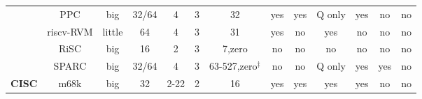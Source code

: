 \begin{sidewaystable}[tbp]
\begin{sf}
\begin{footnotesize}
\begin{center}
\begin{tabular}{|c|c||c|c|c|c|c|c|c|c|c|c|c|}
                 & %
PPC              & %
big              & %
32/64            & %
4                & %
3                & %
32               & %
yes              & %
yes              & %
Q only           & %
yes              & %
no               & %
no                 %
\\
\cline{2-13}

		 & %
riscv-RVM        & %
little           & %
64               & %
4                & %
3                & %
31               & %
yes              & %
no               & %
yes              & %
no               & %
no               & %
no                 %
\\
\cline{2-13}

                 & %
RiSC             & %
big              & %
16               & %
2                & %
3                & %
7,zero           & %
no               & %
no               & %
no               & %
no               & %
no               & %
no                 %
\\
\cline{2-13}

                 & %
SPARC            & %
big              & %
32/64            & %
4                & %
3                & %
63-527,zero$^{\ddagger}$ & %
no               & %
no               & %
Q only           & %
yes              & %
yes              & %
no                 %
\\

\hline\hline


\multirow{5}{*}{\bf CISC} &
m68k             & %
big              & %
32               & %
2-22             & %
2                & %
16               & %
yes              & %
yes              & %
yes              & %
yes              & %
no               & %
no                 %
\\
\cline{2-13}


\end{tabular}
\end{center}
\end{footnotesize}
\end{sf}
\end{sidewaystable}
